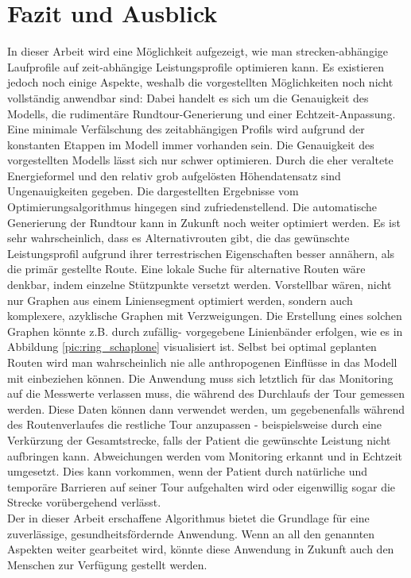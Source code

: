 \documentclass[12pt]{article}
\begin{document}
\section{Fazit und Ausblick}\label{fazit}
In dieser Arbeit wird eine Möglichkeit aufgezeigt, wie man strecken-abhängige Laufprofile auf zeit-abhängige Leistungsprofile optimieren kann. Es existieren jedoch noch einige Aspekte, weshalb die vorgestellten Möglichkeiten noch nicht vollständig anwendbar sind: Dabei handelt es sich um die Genauigkeit des Modells, die rudimentäre Rundtour-Generierung und einer Echtzeit-Anpassung. Eine minimale Verfälschung des zeitabhängigen Profils wird aufgrund der konstanten Etappen im Modell immer vorhanden sein. Die Genauigkeit des vorgestellten Modells lässt sich nur schwer optimieren. Durch die eher veraltete Energieformel und den relativ grob aufgelösten Höhendatensatz sind Ungenauigkeiten gegeben. Die dargestellten Ergebnisse vom Optimierungsalgorithmus hingegen sind zufriedenstellend. Die automatische Generierung der Rundtour kann in Zukunft noch weiter optimiert werden. Es ist sehr wahrscheinlich, dass es Alternativrouten gibt, die das gewünschte Leistungsprofil aufgrund ihrer terrestrischen Eigenschaften besser annähern, als die primär gestellte Route. Eine lokale Suche für alternative Routen wäre denkbar, indem einzelne Stützpunkte versetzt werden. Vorstellbar wären, nicht nur Graphen aus einem Liniensegment optimiert werden, sondern auch komplexere, azyklische Graphen mit Verzweigungen. Die Erstellung eines solchen Graphen könnte z.B. durch zufällig- vorgegebene Linienbänder erfolgen, wie es in Abbildung \ref{pic:ring_schaplone} visualisiert ist. Selbst bei optimal geplanten Routen wird man wahrscheinlich nie alle anthropogenen Einflüsse in das Modell mit einbeziehen können. Die Anwendung muss sich letztlich für das Monitoring auf die Messwerte verlassen muss, die während des Durchlaufs der Tour gemessen werden. Diese Daten können dann verwendet werden, um gegebenenfalls während des Routenverlaufes die restliche Tour anzupassen - beispielsweise durch eine Verkürzung der Gesamtstrecke, falls der Patient die gewünschte Leistung nicht aufbringen kann. Abweichungen werden vom Monitoring erkannt und in Echtzeit umgesetzt. Dies kann vorkommen, wenn der Patient durch natürliche und temporäre Barrieren auf seiner Tour aufgehalten wird oder eigenwillig sogar die Strecke vorübergehend verlässt. \\
Der in dieser Arbeit erschaffene Algorithmus bietet die Grundlage für eine zuverlässige, gesundheitsfördernde Anwendung. Wenn an all den genannten Aspekten weiter gearbeitet wird, könnte diese Anwendung in Zukunft auch den Menschen zur Verfügung gestellt werden. 
\end{document}
